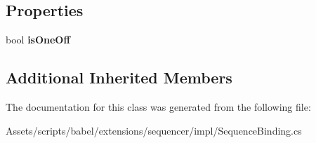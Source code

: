 \subsection*{Properties}
\begin{DoxyCompactItemize}
\item 
\hypertarget{classbabel_1_1extensions_1_1sequencer_1_1impl_1_1_sequence_binding_a9ec97a9b45f4980ff3b40c29cecc182b}{bool {\bfseries is\-One\-Off}}\label{classbabel_1_1extensions_1_1sequencer_1_1impl_1_1_sequence_binding_a9ec97a9b45f4980ff3b40c29cecc182b}

\end{DoxyCompactItemize}
\subsection*{Additional Inherited Members}


The documentation for this class was generated from the following file\-:\begin{DoxyCompactItemize}
\item 
Assets/scripts/babel/extensions/sequencer/impl/Sequence\-Binding.\-cs\end{DoxyCompactItemize}
